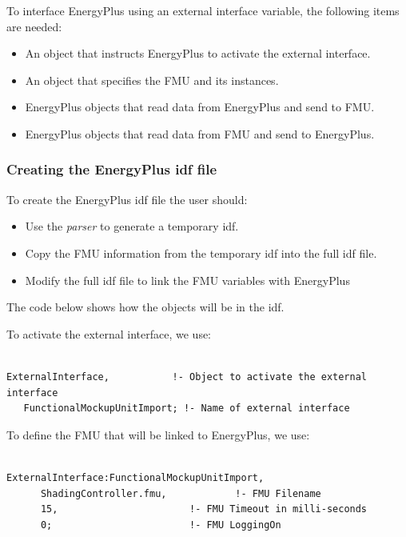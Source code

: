 To interface EnergyPlus using an external interface variable, the following items are needed:

\begin{itemize}
\item
  An object that instructs EnergyPlus to activate the external interface.
\item
  An object that specifies the FMU and its instances.
\item
  EnergyPlus objects that read data from EnergyPlus and send to FMU.
\item
  EnergyPlus objects that read data from FMU and send to EnergyPlus.
\end{itemize}

\subsubsection{Creating the EnergyPlus idf file}\label{creating-the-energyplus-idf-file-2-000}

To create the EnergyPlus idf file the user should:

\begin{itemize}
\item
  Use the \emph{parser} to generate a temporary idf.
\item
  Copy the FMU information from the temporary idf into the full idf file.
\item
  Modify the full idf file to link the FMU variables with EnergyPlus
\end{itemize}

The code below shows how the objects will be in the idf.

To activate the external interface, we use:

\begin{lstlisting}

ExternalInterface,           !- Object to activate the external interface
   FunctionalMockupUnitImport; !- Name of external interface
\end{lstlisting}

To define the FMU that will be linked to EnergyPlus, we use:

\begin{lstlisting}

ExternalInterface:FunctionalMockupUnitImport,
      ShadingController.fmu,            !- FMU Filename
      15,                       !- FMU Timeout in milli-seconds
      0;                        !- FMU LoggingOn
\end{lstlisting}

